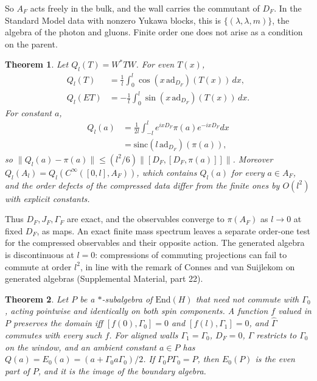 \documentclass[aps,prd,reprint,onecolumn,nofootinbib,amsmath,amssymb,floatfix]{revtex4-2}
\theoremstyle{plain}
\newtheorem{theorem}{Theorem}
\newcommand{\supp}[1]{Supplemental Material, part #1}
\begin{document}
So $A_F$ acts freely in the bulk, and the wall carries the commutant of $D_F$. In the Standard Model data with nonzero Yukawa blocks, this is $\{(\lambda,\lambda,m)\}$, the algebra of the photon and gluons. Finite order one does not arise as a condition on the parent.

\begin{theorem}\label{thm:compression}
Let $Q_l(T)=W^*TW$. For even $T(x)$,
\begin{equation}
\begin{aligned}
Q_l(T)&=\frac1l\int_0^l\cos(x\,\mathrm{ad}_{D_F})(T(x))\,dx,\\
Q_l(ET)&=-\frac1l\int_0^l\sin(x\,\mathrm{ad}_{D_F})(T(x))\,dx.
\end{aligned}
\end{equation}
For constant $a$,
\begin{equation}
\begin{aligned}
Q_l(a)&=\frac1{2l}\int_{-l}^{l}e^{ixD_F}\pi(a)e^{-ixD_F}dx\\
&=\mathrm{sinc}(l\,\mathrm{ad}_{D_F})(\pi(a)),
\end{aligned}
\end{equation}
so $\|Q_l(a)-\pi(a)\|\le(l^2/6)\|[D_F,[D_F,\pi(a)]]\|$. Moreover $Q_l(A_l)=Q_l(C^\infty([0,l],A_F))$, which contains $Q_l(a)$ for every $a\in A_F$, and the order defects of the compressed data differ from the finite ones by $O(l^2)$ with explicit constants.
\end{theorem}

Thus $D_F,J_F,\Gamma_F$ are exact, and the observables converge to $\pi(A_F)$ as $l\to0$ at fixed $D_F$, as maps. An exact finite mass spectrum leaves a separate order-one test for the compressed observables and their opposite action. The generated algebra is discontinuous at $l=0$: compressions of commuting projections can fail to commute at order $l^2$, in line with the remark of Connes and van Suijlekom \cite{CvS2021} on generated algebras (\supp{22}).

\begin{theorem}\label{thm:aligned}
Let $P$ be a $*$-subalgebra of $\mathrm{End}(H)$ that need not commute with $\Gamma_0$, acting pointwise and identically on both spin components. A function $f$ valued in $P$ preserves the domain iff $[f(0),\Gamma_0]=0$ and $[f(l),\Gamma_1]=0$, and $\hat\Gamma$ commutes with every such $f$. For aligned walls $\Gamma_1=\Gamma_0$, $D_F=0$, $\hat\Gamma$ restricts to $\Gamma_0$ on the window, and an ambient constant $a\in P$ has $Q(a)=E_0(a)=(a+\Gamma_0a\Gamma_0)/2$. If $\Gamma_0P\Gamma_0=P$, then $E_0(P)$ is the even part of $P$, and it is the image of the boundary algebra.
\end{theorem}
\end{document}
